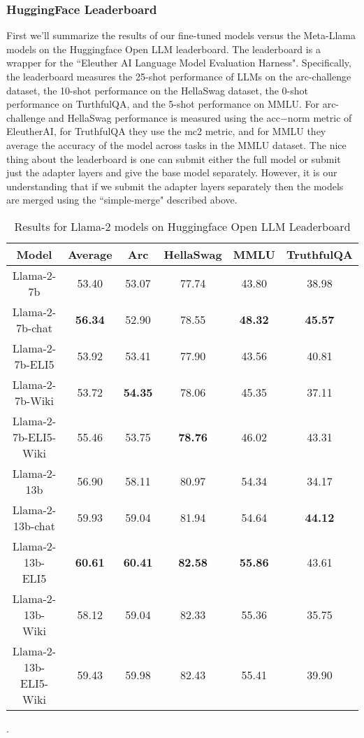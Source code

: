 \documentclass[11pt, oneside]{article}   	%
\begin{document}
\subsubsection{HuggingFace Leaderboard}
First we'll summarize the results of our fine-tuned models versus the Meta-Llama models on the Huggingface Open LLM leaderboard.
The leaderboard is a wrapper for the ``Eleuther AI Language Model Evaluation Harness". 
Specifically, the leaderboard measures the 25-shot performance of LLMs on the arc-challenge dataset, the 10-shot performance on the HellaSwag dataset, the 0-shot performance on TurthfulQA, and the 5-shot performance on MMLU. 
For arc-challenge and HellaSwag performance is measured using the acc$-$norm metric of EleutherAI, for TruthfulQA they use the mc2 metric, and for MMLU they average the accuracy of the model across tasks in the MMLU dataset.
The nice thing about the leaderboard is one can submit either the full model or submit just the adapter layers and give the base model separately.
However, it is our understanding that if we submit the adapter layers separately then the models are merged using the ``simple-merge" described above.
\begin{table}[h]
\begin{center}
\begin{tabular}{|c|c|c|c|c|c|}
\hline
Model &          Average & Arc & HellaSwag & MMLU & TruthfulQA \\
\hline
Llama-2-7b&                  53.40               &   53.07            & 77.74              &  43.80                &  38.98 \\
Llama-2-7b-chat  &          \textbf{56.34} &  52.90              & 78.55             &  \textbf{48.32}    &  \textbf{45.57} \\
Llama-2-7b-ELI5  &           53.92             &  53.41              & 77.90             &  43.56                 & 40.81\\
Llama-2-7b-Wiki &           53.72              &  \textbf{54.35} & 78.06             &  45.35                 & 37.11\\
Llama-2-7b-ELI5-Wiki&    55.46               &  53.75              & \textbf{78.76}&  46.02                   & 43.31\\
\hhline{|=|=|=|=|=|=|}
Llama-2-13b &               56.90              &   58.11             & 80.97            &  54.34            & 34.17\\
Llama-2-13b-chat&        59.93              & 59.04               & 81.94            &  54.64            & \textbf{44.12}\\
Llama-2-13b-ELI5&          \textbf{60.61} &  \textbf{60.41}  & \textbf{82.58}&  \textbf{55.86}& 43.61\\
Llama-2-13b-Wiki&	        58.12             &  59.04               & 82.33            &  55.36            & 35.75\\
Llama-2-13b-ELI5-Wiki&   59.43             &  59.98               & 82.43            &  55.41            & 39.90 \\
\hline
\end{tabular}
\end{center}
\caption{Results for Llama-2 models on Huggingface Open LLM Leaderboard}.
\label{table:hfleaderboard}
\end{table}
\end{document}
